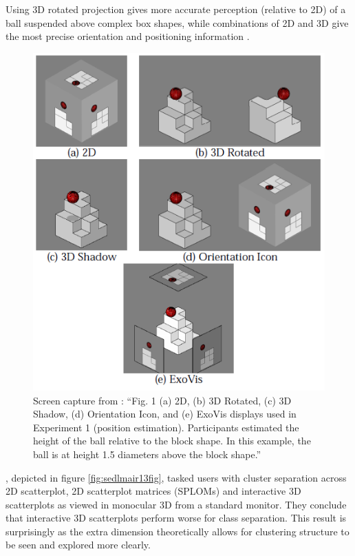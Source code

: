 \documentclass{monashthesis}
\begin{document}
Using 3D rotated projection gives more accurate perception (relative to
2D) of a ball suspended above complex box shapes, while combinations of
2D and 3D give the most precise orientation and positioning information
\autocite[depicted in figure
\ref{fig:tory06fig}]{tory_visualization_2006}.








\begin{figure}

{\centering \includegraphics[width=0.5\linewidth]{./figures/tory06fig} 

}

\caption{Screen capture from
\textcite{tory_visualization_2006}: ``Fig. 1 (a) 2D, (b) 3D Rotated, (c)
3D Shadow, (d) Orientation Icon, and (e) ExoVis displays used in
Experiment 1 (position estimation). Participants estimated the height of
the ball relative to the block shape. In this example, the ball is at
height 1.5 diameters above the block shape.''}\label{fig:tory06fig}
\end{figure}

\textcite{sedlmair_empirical_2013}, depicted in figure
\ref{fig:sedlmair13fig}, tasked users with cluster separation across 2D
scatterplot, 2D scatterplot matrices (SPLOMs) and interactive 3D
scatterplots as viewed in monocular 3D from a standard monitor. They
conclude that interactive 3D scatterplots perform worse for class
separation. This result is surprisingly as the extra dimension
theoretically allows for clustering structure to be seen and explored
more clearly.
\end{document}
